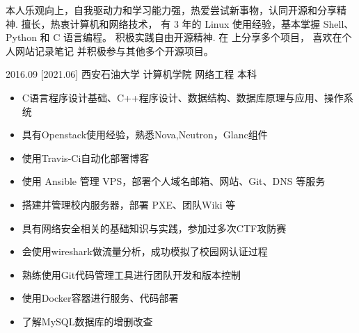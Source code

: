 \documentclass[zh]{resume}
\begin{document}
\makeheader

{\onehalfspacing\hspace{2em}%
本人乐观向上，自我驱动力和学习能力强，热爱尝试新事物，认同开源和分享精神.
擅长，热衷计算机和网络技术，
有 3 年的 Linux 使用经验，基本掌握 Shell、Python 和 C 语言编程。
积极实践自由开源精神.
在  上分享多个项目，
喜欢在个人网站记录笔记
并积极参与其他多个开源项目。
\par}

\begin{competences}
\end{competences}

\begin{educations}
  \education%
    {2016.09}%
    [2021.06]%
    {西安石油大学}%
    {计算机学院}%
    {网络工程}%
    {本科}
\end{educations}
\begin{itemize}
  \item C语言程序设计基础、C++程序设计、数据结构、数据库原理与应用、操作系统
\end{itemize}
\begin{itemize}
  \item 具有Openstack使用经验，熟悉Nova,Neutron，Glanc组件
  \item 使用Travis-Ci自动化部署博客
  \item 使用 Ansible 管理 VPS，部署个人域名邮箱、网站、Git、DNS 等服务
  \item 搭建并管理校内服务器，部署 PXE、团队Wiki 等
  \item 具有网络安全相关的基础知识与实践，参加过多次CTF攻防赛
  \item 会使用wireshark做流量分析，成功模拟了校园网认证过程
  \item 熟练使用Git代码管理工具进行团队开发和版本控制
  \item 使用Docker容器进行服务、代码部署
  \item 了解MySQL数据库的增删改查
\end{itemize}
\end{document}
